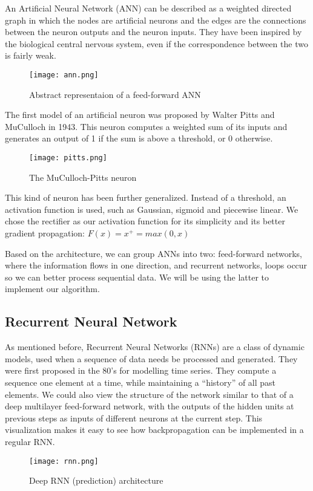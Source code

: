 \documentclass[../Thesis.tex]{subfiles}
\begin{document}
An Artificial Neural Network (ANN) can be described as a weighted directed graph in which the nodes are artificial neurons and the edges are the connections between the neuron outputs and the neuron inputs. They have been inspired by the biological central nervous system, even if the correspondence between the two is fairly weak.
\begin{figure}[h]
\centering
\label {fig: ann}
\texttt{[image: ann.png]}
\caption[width=0.5\textwidth]{Abstract representaion of a feed-forward ANN}
\end{figure}

The first model of an artificial neuron was proposed by Walter Pitts and MuCulloch in 1943. This neuron computes a weighted sum of its inputs and generates an output of 1 if the sum is above a threshold, or 0 otherwise. 
\begin{figure}[h]
\centering
\label {fig: pitt}
\texttt{[image: pitts.png]}
\caption[width=0.5\textwidth]{The MuCulloch-Pitts neuron}
\end{figure}

This kind of neuron has been further generalized. Instead of a threshold, an activation function is used, such as Gaussian, sigmoid and piecewise linear. We chose the rectifier as our activation function for its simplicity and its better gradient propagation:
$F(x) = x_{}^{+} = max(0, x)$

Based on the architecture, we can group ANNs into two: feed-forward networks, where the information flows in one direction, and recurrent networks, loops occur so we can better process sequential data. We will be using the latter to implement our algorithm.


\subsection {Recurrent Neural Network}

As mentioned before, Recurrent Neural Networks (RNNs) are a class of dynamic models, used when a sequence of data needs be processed and generated. They were first proposed in the 80’s for modelling time series. They compute a sequence one element at a time, while maintaining a “history” of all past elements. We could also view the structure of the network similar to that of a deep multilayer feed-forward network, with the outputs of the hidden units at previous steps as inputs of different neurons at the current step. This visualization makes it easy to see how backpropagation can be implemented in a regular RNN.
\begin{figure}[h]
\centering
\label {fig: rnn}
\texttt{[image: rnn.png]}
\caption[width=0.5\textwidth]{Deep RNN (prediction) architecture}
\end{figure}
\end{document}
